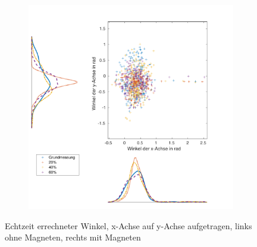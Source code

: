 \begin{figure}[tb]
\begin{adjustwidth}{-0.2\linewidth}{-0.2\linewidth}
\begin{subfigure}[c]{.45\linewidth}
			\includegraphics[width=\linewidth]{Bilder/Winkel_Grund_20_40_60_mitM.pdf}
			\vspace{5pt}
		\end{subfigure}
	\end{adjustwidth}
	\caption{Echtzeit errechneter Winkel, x-Achse auf y-Achse aufgetragen, links ohne Magneten, rechts mit Magneten} \label{Angle}
\end{figure}

